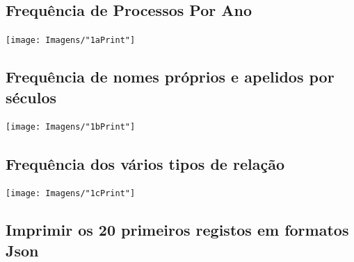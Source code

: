 \documentclass[11pt,a4paper]{report}%
\begin{document}
\subsection{Frequência de Processos Por Ano}

\texttt{[image: Imagens/"1aPrint"]}

\subsection{Frequência de nomes próprios e apelidos por séculos}

\texttt{[image: Imagens/"1bPrint"]}

\subsection{Frequência dos vários tipos de relação}

\texttt{[image: Imagens/"1cPrint"]}

\subsection{Imprimir os 20 primeiros registos em formatos Json}
\end{document}
